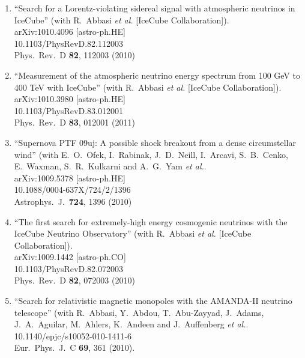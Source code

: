 \begin{enumerate}
\item ``Search for a Lorentz-violating sidereal signal with atmospheric
  neutrinos in IceCube'' (with R.~Abbasi {\it et al.}  [IceCube
    Collaboration]).  \\{}arXiv:1010.4096 [astro-ph.HE]
  \\{}10.1103/PhysRevD.82.112003 \\{}Phys.\ Rev.\ D {\bf 82}, 112003
  (2010) %


\item ``Measurement of the atmospheric neutrino energy spectrum from 100 GeV
  to 400 TeV with IceCube'' (with R.~Abbasi {\it et al.}  [IceCube
    Collaboration]).  \\{}arXiv:1010.3980 [astro-ph.HE]
  \\{}10.1103/PhysRevD.83.012001 \\{}Phys.\ Rev.\ D {\bf 83}, 012001
  (2011) %

\item ``Supernova PTF 09uj: A possible shock breakout from a dense
  circumstellar wind'' (with E.~O.~Ofek, I.~Rabinak, J.~D.~Neill,
  I.~Arcavi, S.~B.~Cenko, E.~Waxman, S.~R.~Kulkarni and A.~G.~Yam {\it
    et al.}.  \\{}arXiv:1009.5378 [astro-ph.HE]
  \\{}10.1088/0004-637X/724/2/1396 \\{}Astrophys.\ J.\ {\bf 724}, 1396
  (2010) %


\item ``The first search for extremely-high energy cosmogenic neutrinos with
  the IceCube Neutrino Observatory'' (with R.~Abbasi {\it et al.}
  [IceCube Collaboration]).  \\{}arXiv:1009.1442 [astro-ph.CO]
  \\{}10.1103/PhysRevD.82.072003 \\{}Phys.\ Rev.\ D {\bf 82}, 072003
  (2010) %


\item ``Search for relativistic magnetic monopoles with the AMANDA-II
  neutrino telescope'' (with R.~Abbasi, Y.~Abdou, T.~Abu-Zayyad,
  J.~Adams, J.~A.~Aguilar, M.~Ahlers, K.~Andeen and J.~Auffenberg {\it
    et al.}.  \\{}10.1140/epjc/s10052-010-1411-6
  \\{}Eur.\ Phys.\ J.\ C {\bf 69}, 361 (2010). %



\end{enumerate}
